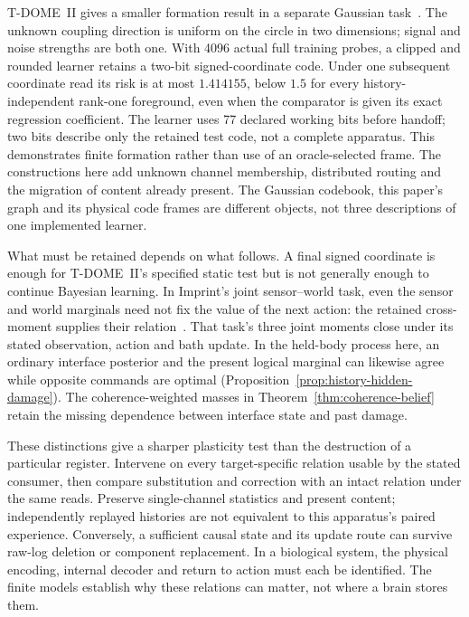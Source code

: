 \documentclass[11pt]{article}
\theoremstyle{definition}
\theoremstyle{remark}
\begin{document}
T-DOME~II gives a smaller formation result in a separate Gaussian
task~\cite{TDOMEII}. The unknown coupling direction is uniform on the
circle in two dimensions; signal and noise strengths are both one.
With 4096 actual full training probes, a clipped and rounded learner
retains a two-bit signed-coordinate code. Under one
subsequent coordinate read its risk is at most $1.414155$, below $1.5$
for every history-independent rank-one foreground, even when the comparator
is given its exact regression coefficient. The learner uses 77 declared
working bits before handoff; two bits describe only the retained test code,
not a complete apparatus. This demonstrates finite formation rather than
use of an oracle-selected frame. The constructions here add unknown channel membership,
distributed routing and the migration of content already present.
The Gaussian codebook, this paper's graph and its physical code frames
are different objects, not three descriptions of one implemented learner.

What must be retained depends on what follows. A final signed coordinate
is enough for T-DOME~II's specified static test but is not generally enough
to continue Bayesian learning. In Imprint's joint sensor--world task,
even the sensor and world marginals need not fix the value of the next
action: the retained cross-moment supplies their relation~\cite{StableHulls}.
That task's three joint moments close under its stated observation,
action and bath update. In the held-body process here, an ordinary
interface posterior and the present logical marginal can likewise agree
while opposite commands are optimal
(Proposition~\ref{prop:history-hidden-damage}). The coherence-weighted
masses in Theorem~\ref{thm:coherence-belief} retain the missing dependence
between interface state and past damage.

These distinctions give a sharper plasticity test than the destruction
of a particular register. Intervene on every target-specific relation
usable by the stated consumer, then compare substitution and correction
with an intact relation under the same reads. Preserve single-channel
statistics and present content; independently replayed histories are not
equivalent to this apparatus's paired experience. Conversely, a sufficient
causal state and its update route can survive raw-log deletion or component
replacement. In a biological system, the physical encoding, internal
decoder and return to action must each be identified. The finite models
establish why these relations can matter, not where a brain stores them.
\end{document}
